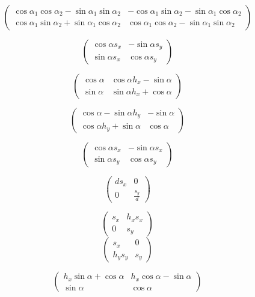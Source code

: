 \[\tag{R1R2}
\begin{pmatrix}
\cos{\alpha_1 } \cos{\alpha_2 }-\sin{\alpha_1 } \sin{\alpha_2 } & -\cos{\alpha_1 } \sin{\alpha_2 }-\sin{\alpha_1 } \cos{\alpha_2 }\\
\cos{\alpha_1 } \sin{\alpha_2 }+\sin{\alpha_1 } \cos{\alpha_2 } & \cos{\alpha_1 } \cos{\alpha_2 }-\sin{\alpha_1 } \sin{\alpha_2 }
\end{pmatrix}\]

\[\tag{RS}
\begin{pmatrix}
\cos{\alpha} {s_x} & -\sin{\alpha} {s_y}\\
\sin{\alpha} {s_x} & \cos{\alpha} {s_y}
\end{pmatrix}\]

\[\tag{RX}
\begin{pmatrix}
\cos{\alpha} & \cos{\alpha} {h_x}-\sin{\alpha}\\
\sin{\alpha} & \sin{\alpha} {h_x}+\cos{\alpha}
\end{pmatrix}\]

\[\tag{RY}
\begin{pmatrix}
\cos{\alpha}-\sin{\alpha} {h_y} & -\sin{\alpha}\\
\cos{\alpha} {h_y}+\sin{\alpha} & \cos{\alpha}
\end{pmatrix}\]

\[\tag{SR}
\begin{pmatrix}
\cos{\alpha} {s_x} & -\sin{\alpha} {s_x}\\
\sin{\alpha} {s_y} & \cos{\alpha} {s_y}
\end{pmatrix}\]

\[\tag{SD}
\begin{pmatrix}
d {s_x} & 0\\
0 & \frac{{s_y}}{d}
\end{pmatrix}\]

\[\tag{SX}
\begin{pmatrix}
{s_x} & {h_x} {s_x}\\
0 & {s_y}
\end{pmatrix}\]
\[\tag{SY}
\begin{pmatrix}
{s_x} & 0\\
{h_y} {s_y} & {s_y}
\end{pmatrix}\]

\[\tag{XR}
\begin{pmatrix}
{h_x} \sin{\alpha}+\cos{\alpha} & {h_x} \cos{\alpha}-\sin{\alpha}\\
\sin{\alpha} & \cos{\alpha}
\end{pmatrix}\]

